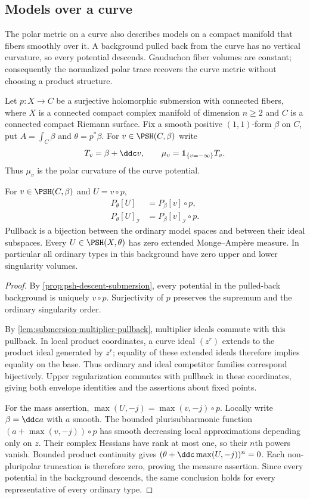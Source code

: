\subsection{Models over a curve}
\label{subsec:curve-fibration-polar-models}

The polar metric on a curve also describes models on a compact
manifold that fibers smoothly over it. A background pulled back
from the curve has no vertical curvature, so every potential
descends. Gauduchon fiber volumes are constant; consequently the
normalized polar trace recovers the curve metric without choosing
a product structure.

Let $p:X\to C$ be a surjective holomorphic submersion with connected
fibers, where $X$ is a connected compact complex manifold of
dimension $n\geq2$ and $C$ is a connected compact Riemann surface.
Fix a smooth positive $(1,1)$-form $\beta$ on $C$, put
$A=\int_C\beta$ and $\theta=p^*\beta$. For
$v\in\PSH(C,\beta)$ write
\[
 T_v=\beta+\ddc v,\qquad
 \mu_v=\mathbf1_{\{v=-\infty\}}T_v.
\]
Thus $\mu_v$ is the polar curvature of the curve potential.

\begin{lemma}\label{fibration:curve-envelope-pullback}
For $v\in\PSH(C,\beta)$ and $U=v\circ p$,
\[
 \begin{aligned}
 P_\theta[U]&=P_\beta[v]\circ p,\\
 P_\theta[U]_{\mathcal I}&=P_\beta[v]_{\mathcal I}\circ p.
 \end{aligned}
\]
Pullback is a bijection between the ordinary model spaces and
between their ideal subspaces. Every $U\in\PSH(X,\theta)$ has zero
extended Monge--Amp\`ere measure. In particular all ordinary types
in this background have zero upper and lower singularity volumes.
\end{lemma}
\begin{proof}
By \cref{prop:psh-descent-submersion}, every potential in the
pulled-back background is uniquely $v\circ p$. Surjectivity of $p$
preserves the supremum and the ordinary singularity order.

By \cref{lem:submersion-multiplier-pullback}, multiplier ideals
commute with this pullback. In local product coordinates, a curve
ideal $(z^r)$ extends to the product ideal generated by $z^r$;
equality of these extended ideals therefore implies equality on
the base. Thus ordinary and ideal competitor
families correspond bijectively. Upper regularization commutes
with pullback in these coordinates, giving both envelope identities
and the assertions about fixed points.

For the mass assertion, $\max(U,-j)=\max(v,-j)\circ p$.
Locally write $\beta=\ddc a$ with $a$ smooth. The bounded
plurisubharmonic function $(a+\max(v,-j))\circ p$ has smooth
decreasing local approximations depending only on $z$.
Their complex Hessians have rank at most one, so their $n$th
powers vanish. Bounded product continuity gives
$(\theta+\ddc\max(U,-j))^n=0$. Each non-pluripolar truncation is
therefore zero, proving the measure assertion. Since every
potential in the background descends, the same conclusion holds
for every representative of every ordinary type.
\end{proof}

